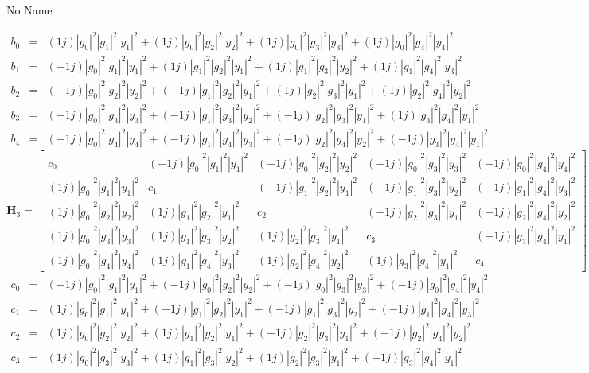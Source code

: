 \documentclass[a4paper,10pt]{article}
\begin{document}
\begin{section}{No Name}
\begin{landscape}
\begin{equation}
\end{equation}
\begin{eqnarray}
b_{0} &=& (1j)|g_0|^2|g_1|^2|y_1|^2 + (1j)|g_0|^2|g_2|^2|y_2|^2 + (1j)|g_0|^2|g_3|^2|y_3|^2 + (1j)|g_0|^2|g_4|^2|y_4|^2\\
b_{1} &=& (-1j)|g_0|^2|g_1|^2|y_1|^2 + (1j)|g_1|^2|g_2|^2|y_1|^2 + (1j)|g_1|^2|g_3|^2|y_2|^2 + (1j)|g_1|^2|g_4|^2|y_3|^2\\
b_{2} &=& (-1j)|g_0|^2|g_2|^2|y_2|^2 + (-1j)|g_1|^2|g_2|^2|y_1|^2 + (1j)|g_2|^2|g_3|^2|y_1|^2 + (1j)|g_2|^2|g_4|^2|y_2|^2\\
b_{3} &=& (-1j)|g_0|^2|g_3|^2|y_3|^2 + (-1j)|g_1|^2|g_3|^2|y_2|^2 + (-1j)|g_2|^2|g_3|^2|y_1|^2 + (1j)|g_3|^2|g_4|^2|y_1|^2\\
b_{4} &=& (-1j)|g_0|^2|g_4|^2|y_4|^2 + (-1j)|g_1|^2|g_4|^2|y_3|^2 + (-1j)|g_2|^2|g_4|^2|y_2|^2 + (-1j)|g_3|^2|g_4|^2|y_1|^2
\end{eqnarray}
\begin{equation}
\boldsymbol{H}_3 = 
\begin{bmatrix}
c_{0}&(-1j)|g_0|^2|g_1|^2|y_1|^2&(-1j)|g_0|^2|g_2|^2|y_2|^2&(-1j)|g_0|^2|g_3|^2|y_3|^2&(-1j)|g_0|^2|g_4|^2|y_4|^2\\
(1j)|g_0|^2|g_1|^2|y_1|^2&c_{1}&(-1j)|g_1|^2|g_2|^2|y_1|^2&(-1j)|g_1|^2|g_3|^2|y_2|^2&(-1j)|g_1|^2|g_4|^2|y_3|^2\\
(1j)|g_0|^2|g_2|^2|y_2|^2&(1j)|g_1|^2|g_2|^2|y_1|^2&c_{2}&(-1j)|g_2|^2|g_3|^2|y_1|^2&(-1j)|g_2|^2|g_4|^2|y_2|^2\\
(1j)|g_0|^2|g_3|^2|y_3|^2&(1j)|g_1|^2|g_3|^2|y_2|^2&(1j)|g_2|^2|g_3|^2|y_1|^2&c_{3}&(-1j)|g_3|^2|g_4|^2|y_1|^2\\
(1j)|g_0|^2|g_4|^2|y_4|^2&(1j)|g_1|^2|g_4|^2|y_3|^2&(1j)|g_2|^2|g_4|^2|y_2|^2&(1j)|g_3|^2|g_4|^2|y_1|^2&c_{4}
\end{bmatrix}
\end{equation}
\begin{eqnarray}
c_{0} &=& (-1j)|g_0|^2|g_1|^2|y_1|^2 + (-1j)|g_0|^2|g_2|^2|y_2|^2 + (-1j)|g_0|^2|g_3|^2|y_3|^2 + (-1j)|g_0|^2|g_4|^2|y_4|^2\\
c_{1} &=& (1j)|g_0|^2|g_1|^2|y_1|^2 + (-1j)|g_1|^2|g_2|^2|y_1|^2 + (-1j)|g_1|^2|g_3|^2|y_2|^2 + (-1j)|g_1|^2|g_4|^2|y_3|^2\\
c_{2} &=& (1j)|g_0|^2|g_2|^2|y_2|^2 + (1j)|g_1|^2|g_2|^2|y_1|^2 + (-1j)|g_2|^2|g_3|^2|y_1|^2 + (-1j)|g_2|^2|g_4|^2|y_2|^2\\
c_{3} &=& (1j)|g_0|^2|g_3|^2|y_3|^2 + (1j)|g_1|^2|g_3|^2|y_2|^2 + (1j)|g_2|^2|g_3|^2|y_1|^2 + (-1j)|g_3|^2|g_4|^2|y_1|^2\\

\end{eqnarray}
\end{landscape}
\end{section}
\end{document}
